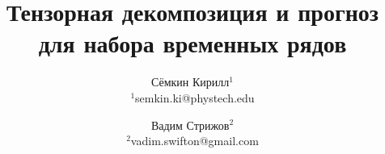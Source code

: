 
\usepackage[backend=biber]{biblatex}



\makeatletter
\let\@fnsymbol\@arabic
\makeatother

\newenvironment{comment}{}{}


\title{Тензорная декомпозиция и прогноз для набора временных рядов}
\author{Сёмкин Кирилл$^{1}$ \\ {\footnotesize $^{1}$semkin.ki@phystech.edu} \and Вадим Стрижов$^{2}$ \\ {\footnotesize $^{2}$vadim.swifton@gmail.com}}
\date{}



	
	\maketitle
	
